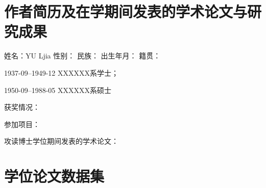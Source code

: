 \documentclass[a4paper,12pt,oneside,openany]{book}
\newcommand{\WU}{\fontsize{10.54}{12.65}\selectfont}%
\begin{document}
\begin{CJK}{UTF8}{hei}
\chapter*{作者简历及在学期间发表的学术论文与研究成果}

\begin{center}
姓名：YU Ljia 性别：  民族：  出生年月：  籍贯： 
\par\end{center}

\begin{center}
1937-09--1949-12 XXXXXX系学士；
\par\end{center}

\begin{center}
1950-09--1988-05 XXXXXX系硕士
\par\end{center}

\begin{center}
获奖情况：
\par\end{center}

\begin{center}
参加项目：
\par\end{center}

\begin{center}
攻读博士学位期间发表的学术论文：
\par\end{center}


\chapter*{学位论文数据集}

\begin{table}[tbph]
\addtolength{\tabcolsep}{-2.7pt}\WU


\end{table}
\end{CJK}
\end{document}
